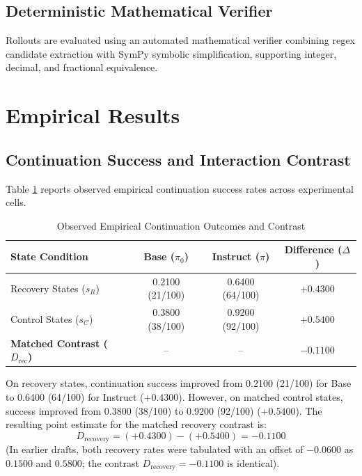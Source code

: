 \documentclass[conference]{IEEEtran}
\begin{document}
\subsection{Deterministic Mathematical Verifier}
Rollouts are evaluated using an automated mathematical verifier combining regex candidate extraction with SymPy symbolic simplification, supporting integer, decimal, and fractional equivalence.

\section{Empirical Results}

\subsection{Continuation Success and Interaction Contrast}
Table \ref{tab:outcomes} reports observed empirical continuation success rates across experimental cells.

\begin{table}[htbp]
\caption{Observed Empirical Continuation Outcomes and Contrast}
\label{tab:outcomes}
\centering
\begin{tabularx}{\columnwidth}{Xccc}
\toprule
\textbf{State Condition} & \textbf{Base ($\pi_0$)} & \textbf{Instruct ($\pi$)} & \textbf{Difference ($\Delta$)} \\
\midrule
Recovery States ($s_R$) & 0.2100 (21/100) & 0.6400 (64/100) & $+0.4300$ \\
Control States ($s_C$) & 0.3800 (38/100) & 0.9200 (92/100) & $+0.5400$ \\
\midrule
\textbf{Matched Contrast ($D_{\text{rec}}$)} & -- & -- & \textbf{$-0.1100$} \\
\bottomrule
\end{tabularx}
\end{table}

On recovery states, continuation success improved from 0.2100 (21/100) for Base to 0.6400 (64/100) for Instruct ($+0.4300$). However, on matched control states, success improved from 0.3800 (38/100) to 0.9200 (92/100) ($+0.5400$). The resulting point estimate for the matched recovery contrast is:
\begin{equation}
D_{\text{recovery}} = (+0.4300) - (+0.5400) = \mathbf{-0.1100}
\end{equation}
(In earlier drafts, both recovery rates were tabulated with an offset of $-0.0600$ as $0.1500$ and $0.5800$; the contrast $D_{\text{recovery}} = -0.1100$ is identical).
\end{document}
